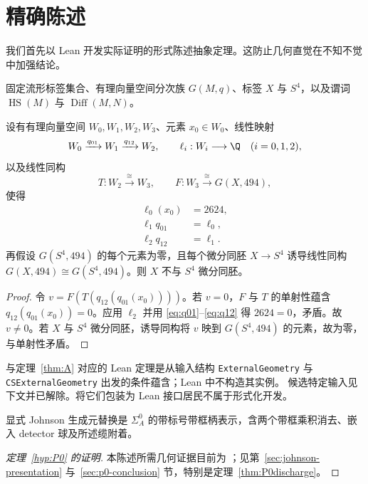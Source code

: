 \section{精确陈述}

我们首先以 Lean 开发实际证明的形式陈述抽象定理。这防止几何直觉在不知不觉中加强结论。

固定流形标签集合、有理向量空间分次族 $G(M,q)$、标签 $X$ 与 $S^4$，以及谓词
\(\operatorname{HS}(M)\) 与 \(\operatorname{Diff}(M,N)\)。

\begin{theorem}[抽象非标准性定理]\label{thm:A}
设有有理向量空间 $W_0,W_1,W_2,W_3$、元素 $x_0\in W_0$、线性映射
\[
W_0\xrightarrow{q_{01}}W_1\xrightarrow{q_{12}}W_2,
\qquad
\ell_i:W_i\longrightarrow\Q\quad (i=0,1,2),
\]
以及线性同构
\[
T:W_2\xrightarrow{\cong}W_3,
\qquad
F:W_3\xrightarrow{\cong}G(X,494),
\]
使得
\begin{align}
\ell_0(x_0)&=2624,\label{eq:value}\\
\ell_1q_{01}&=\ell_0,\label{eq:q01}\\
\ell_2q_{12}&=\ell_1.\label{eq:q12}
\end{align}
再假设 $G(S^4,494)$ 的每个元素为零，且每个微分同胚 $X\to S^4$ 诱导线性同构
\(G(X,494)\cong G(S^4,494)\)。则 $X$ 不与 $S^4$ 微分同胚。
\end{theorem}

\begin{proof}
令 $v=F(T(q_{12}(q_{01}(x_0))))$。若 $v=0$，$F$ 与 $T$ 的单射性蕴含 $q_{12}(q_{01}(x_0))=0$。应用 $\ell_2$ 并用 \eqref{eq:q01}--\eqref{eq:q12} 得 $2624=0$，矛盾。故 $v\ne0$。若 $X$ 与 $S^4$ 微分同胚，诱导同构将 $v$ 映到 $G(S^4,494)$ 的元素，故为零，与单射性矛盾。
\end{proof}

与定理~\ref{thm:A} 对应的 Lean 定理是从输入结构 \texttt{ExternalGeometry} 与
\texttt{CSExternalGeometry} 出发的条件蕴含；Lean 中不构造其实例。
候选特定输入见下文并已解除。将它们包装为 Lean 接口居民不属于形式化开发。

\begin{theorem}[嵌入候选表示，P0]\label{hyp:P0}
显式 Johnson 生成元替换是 $\Sigma_A^0$ 的带标号带框柄表示，含两个带框乘积消去、嵌入 detector 球及所述缆附着。
\end{theorem}

\begin{proof}[定理~\ref{hyp:P0} 的证明]
本陈述所需几何证据目前为 \Open；见第~\ref{sec:johnson-presentation} 与~\ref{sec:p0-conclusion} 节，特别是定理~\ref{thm:P0discharge}。
\end{proof}

